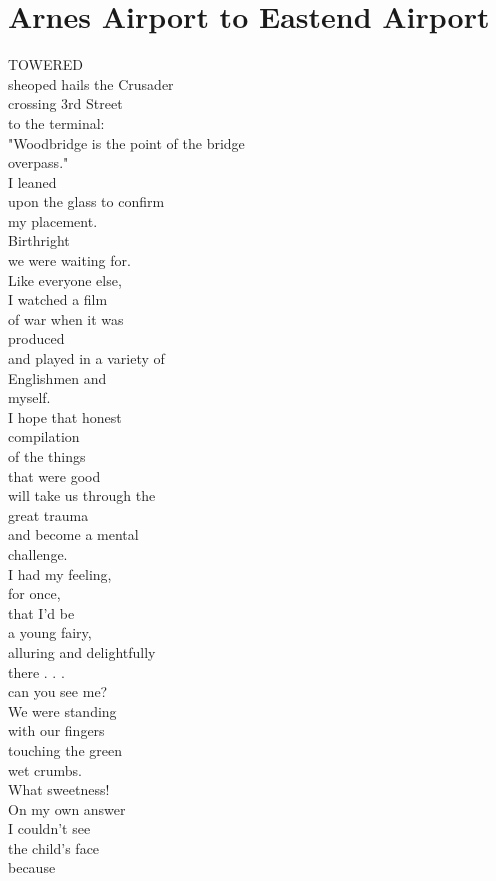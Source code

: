 \documentclass[smalldemyvopaper,11pt,twoside,onecolumn,openright,extrafontsizes]{memoir}
\begin{document}
\chapter{Arnes Airport to Eastend Airport}
TOWERED
\\sheoped hails the Crusader
\\crossing 3rd Street
\\to the terminal:
\\"Woodbridge is the point of the bridge
\\overpass."
\\I leaned
\\upon the glass to confirm
\\my placement.
\\Birthright
\\we were waiting for.
\\Like everyone else,
\\I watched a film
\\of war when it was
\\produced
\\and played in a variety of
\\Englishmen and
\\myself.
\\I hope that honest
\\compilation
\\of the things
\\that were good
\\will take us through the
\\great trauma
\\and become a mental
\\challenge.
\\I had my feeling,
\\for once,
\\that I'd be
\\a young fairy,
\\alluring and delightfully
\\there . . .
\\can you see me?
\\We were standing
\\with our fingers
\\touching the green
\\wet crumbs.
\\What sweetness!
\\On my own answer
\\I couldn't see
\\the child's face
\\because
\end{document}
